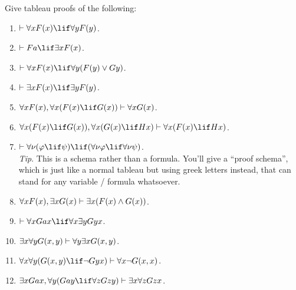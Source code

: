 \documentclass[../../../../include/open-logic-section]{subfiles}
\begin{document}


\begin{prob}
Give tableau proofs of the following:
\begin{enumerate}
\item $\vdash\lforall x\Atom{F}{x}\lif\lforall y\Atom{F}{y}$.
\item $\vdash Fa\lif\lexists x\Atom{F}{x}$.
\item $\vdash\lforall x\Atom{F}{x}\lif\lforall y(\Atom{F}{y}\lor Gy)$.
\item $\vdash\lexists x\Atom{F}{x}\lif\lexists y\Atom{F}{y}$.
\item $\lforall x\Atom{F}{x},\lforall x(\Atom{F}{x}\lif \Atom{G}{x})\vdash\lforall x\Atom{G}{x}$.
\item $\lforall x(\Atom{F}{x}\lif \Atom{G}{x}),\lforall x(\Atom{G}{x}\lif Hx)\vdash\lforall x(\Atom{F}{x}\lif Hx)$.
\item $\vdash\lforall\nu(\phi\lif\psi)\lif(\lforall\nu\phi\lif\lforall\nu\psi)$.\\
\emph{Tip}. This is a schema rather than a formula. You'll give a
``proof schema'', which is just like a normal tableau but using
greek letters instead, that can stand for any variable / formula whatsoever.
\item $\lforall x\Atom{F}{x},\lexists x\Atom{G}{x}\vdash\lexists x(\Atom{F}{x}\land \Atom{G}{x})$.
\item $\vdash\lforall xGax\lif\lforall x\lexists yGyx$.
\item $\lexists x\lforall y\Atom{G}{x,y}\vdash\lforall y\lexists x\Atom{G}{x,y}$.
\item $\lforall x\lforall y(\Atom{G}{x,y}\lif\lnot Gyx)\vdash\lforall x\lnot \Atom{G}{x,x}$.
\item $\lexists xGax,\lforall y(Gay\lif\lforall zGzy)\vdash\lexists x\lforall zGzx$.
\end{enumerate}
\end{prob}
\end{document}
